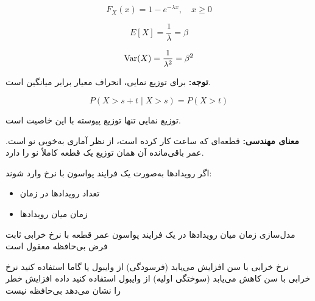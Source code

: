 
\[F_X(x) = 1 - e^{-\lambda x}, \quad x \geq 0\]


\[E[X] = \frac{1}{\lambda} = \beta\]


\[\text{Var}(X) = \frac{1}{\lambda^2} = \beta^2\]

\textbf{توجه:} برای توزیع نمایی، انحراف معیار برابر میانگین است.


\[P(X > s + t \mid X > s) = P(X > t)\]

توزیع نمایی تنها توزیع پیوسته با این خاصیت است.

\textbf{معنای مهندسی:} قطعه‌ای که  ساعت کار کرده است، از نظر آماری به‌خوبی نو است. عمر باقی‌مانده آن همان توزیع یک قطعه کاملاً نو را دارد.


اگر رویدادها به‌صورت یک فرایند پواسون با نرخ \lr{\ensuremath{\lambda}} وارد شوند:

\begin{itemize}
\tightlist
\item
  تعداد رویدادها در زمان 
\item
  زمان میان رویدادها 
\end{itemize}


\lr{\PSyes{}} مدل‌سازی زمان میان رویدادها در یک فرایند پواسون\PSbr{}\lr{\PSyes{}} عمر قطعه با نرخ خرابی ثابت\PSbr{}\lr{\PSyes{}} فرض بی‌حافظه معقول است


\PSno{} نرخ خرابی با سن افزایش می‌یابد (فرسودگی)  از وایبول یا گاما استفاده کنید\PSbr{}\PSno{} نرخ خرابی با سن کاهش می‌یابد (سوختگی اولیه)  از وایبول استفاده کنید\PSbr{}\PSno{} داده افزایش خطر را نشان می‌دهد  بی‌حافظه نیست



